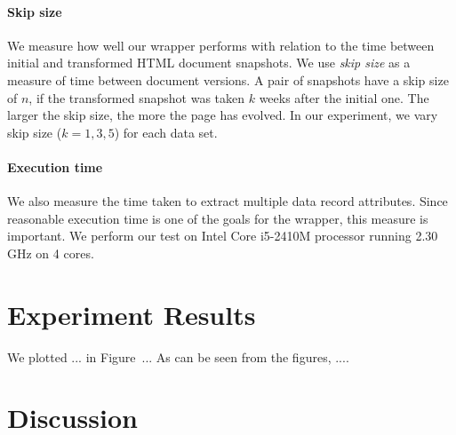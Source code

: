 \paragraph{Skip size} We measure how well our wrapper performs with relation to the time between initial and transformed HTML document snapshots. We use \emph{skip size} as a measure of time between document versions. A pair of snapshots have a skip size of $n$, if the transformed snapshot was taken $k$ weeks after the initial one. The larger the skip size, the more the page has evolved. In our experiment, we vary skip size ($k = 1, 3, 5$) for each data set.

\paragraph{Execution time} We also measure the time taken to extract multiple data record attributes. Since reasonable execution time is one of the goals for the wrapper, this measure is important. We perform our test on Intel Core i5-2410M processor running 2.30 GHz on 4 cores.


\section{Experiment Results}

We plotted ... in Figure~... As can be seen from the figures, ....


\section{Discussion}


